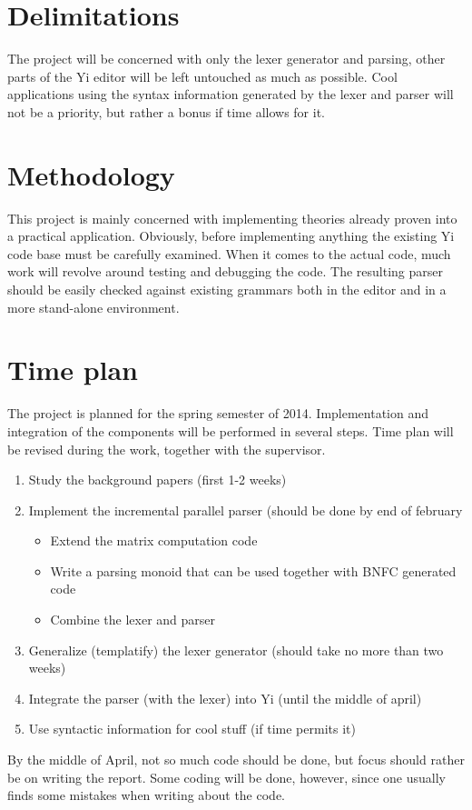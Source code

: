 \documentclass[a4paper,12pt]{article}
\begin{document}
\section*{Delimitations}
The project will be concerned with only the lexer generator and parsing, other
parts of the Yi editor will be left untouched as much as possible. Cool
applications using the syntax information generated by the lexer and parser will
not be a priority, but rather a bonus if time allows for it.

\section*{Methodology}
This project is mainly concerned with implementing theories already proven into
a practical application. Obviously, before implementing anything the existing Yi
code base must be carefully examined. When it comes to the actual code, much
work will revolve around testing and debugging the code. The resulting parser
should be easily checked against existing grammars both in the editor and in a
more stand-alone environment.

\section*{Time plan}
The project is planned for the spring semester of 2014. Implementation and
integration of the components will be performed in several steps. Time plan will
be revised during the work, together with the supervisor.
\begin{enumerate}
    \item{Study the background papers (first 1-2 weeks)}
    \item{Implement the incremental parallel parser (should be done by end of
          february}
        \begin{itemize}
            \item{Extend the matrix computation code}
            \item{Write a parsing monoid that can be used together with BNFC
                  generated code}
            \item{Combine the lexer and parser}
        \end{itemize}
    \item{Generalize (templatify) the lexer generator (should take no more than
          two weeks)}
    \item{Integrate the parser (with the lexer) into Yi (until the middle of
          april)}
    \item{Use syntactic information for cool stuff (if time permits it)}
\end{enumerate}
By the middle of April, not so much code should be done, but focus should rather
be on writing the report. Some coding will be done, however, since one usually
finds some mistakes when writing about the code.
\end{document}
